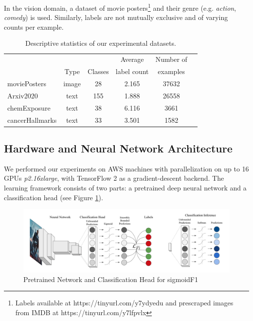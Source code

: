 In the vision domain, a dataset of movie posters\footnote{Labels available at https://tinyurl.com/y7ydyedu and prescraped images from IMDB at https://tinyurl.com/y7lfpvlx} and their genre (e.g. \emph{action}, \emph{comedy}) is used. Similarly, labels are not mutually exclusive and of varying counts per example. 

\begin{table}
\caption{Descriptive statistics of our experimental datasets.}
\label{tab:arxiv2020}
\centering
\begin{tabular}{l ccccc}
\toprule
& & & Average & Number of \\
& Type & Classes & label count & examples \\
\midrule
moviePosters & image & 28 & 2.165 & 37632\\
Arxiv2020 & text & 155 & 1.888 & 26558\\ 
chemExposure & text & 38 & 6.116 & 3661\\
cancerHallmarks\hspace{-.7em}  & text & 33 & 3.501 & 1582\\
\bottomrule
\end{tabular}
\end{table}

\subsection{Hardware and Neural Network Architecture}

We performed our experiments on AWS machines with parallelization on up to 16 GPUs \textit{p2.16xlarge}, with TensorFlow 2 as a gradient-descent backend. The learning framework consists of two parts: a pretrained deep neural network and a classification head (see Figure \ref{fig:architecture}).

\begin{figure}[htbp]
\centering
\includegraphics[width=.9\linewidth]{./images/architecture.png}
\caption{\label{fig:architecture}
Pretrained Network and Classification Head for sigmoidF1 }
\end{figure}



